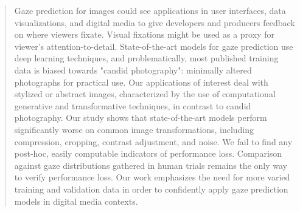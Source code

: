 \begin{abstract}
Gaze prediction for images could see applications in user interfaces, data visualizations, and digital media to give developers and producers feedback on where viewers fixate. Visual fixations might be used as a proxy for viewer's attention-to-detail. State-of-the-art models for gaze prediction use deep learning techniques, and problematically, most published training data is biased towards "candid photography": minimally altered photographs for practical use. Our applications of interest deal with stylized or abstract images, characterized by the use of computational generative and transformative techniques, in contrast to candid photography. Our study shows that state-of-the-art models perform significantly worse on common image transformations, including compression, cropping, contrast adjustment, and noise. We fail to find any post-hoc, easily computable indicators of performance loss. Comparison against gaze distributions gathered in human trials remains the only way to verify performance loss. Our work emphasizes the need for more varied training and validation data in order to confidently apply gaze prediction models in digital media contexts.
\end{abstract}